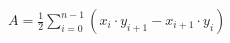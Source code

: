 \documentclass{article}
\begin{document}
$ A = \frac{1}{2} \sum_{i=0}^{n-1} (x_i\cdot y_{i+1} - x_{i+1}\cdot y_i) $
\pagebreak
\end{document}

